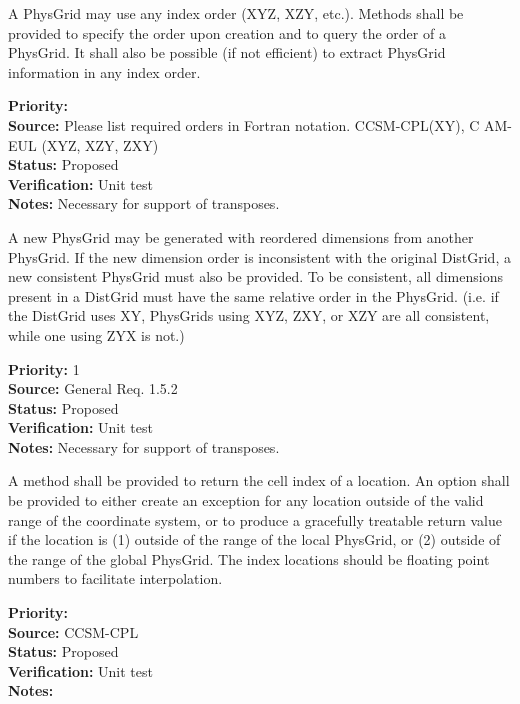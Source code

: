 A PhysGrid may use any index order (XYZ, XZY, etc.).  Methods shall be provided to
specify the order upon creation and to query the order of a PhysGrid.  It shall
also be possible (if not efficient) to extract PhysGrid information in any index
order.
\begin{reqlist}
{\bf Priority:}  \\
{\bf Source:} Please list required orders in Fortran notation. CCSM-CPL(XY), C
AM-EUL (XYZ, XZY, ZXY) \\
{\bf Status:} Proposed \\
{\bf Verification:} Unit test\\
{\bf Notes:} Necessary for support of transposes.
\end{reqlist}

A new PhysGrid may be generated with reordered dimensions from another PhysGrid.
If the new dimension order is inconsistent with the original DistGrid, a new
consistent PhysGrid must also be provided.  To be consistent, all dimensions present
in a DistGrid must have the same relative order in the PhysGrid.  (i.e. if the
DistGrid uses XY, PhysGrids using XYZ, ZXY, or XZY are all consistent, while one using
ZYX is not.)
\begin{reqlist}
{\bf Priority:} 1 \\
{\bf Source:} General Req. 1.5.2 \\
{\bf Status:} Proposed \\
{\bf Verification:} Unit test\\
{\bf Notes:} Necessary for support of transposes.
\end{reqlist}

A method shall be provided to return the cell index of a location.  An option shall
be provided to either create an exception for any location outside of the valid
range of the coordinate system, or to produce a gracefully treatable return value if
the location is (1) outside of the range of the local PhysGrid, or (2) outside of the
range of the global PhysGrid.  The index locations should be floating point numbers to
facilitate interpolation.
\begin{reqlist}
{\bf Priority:} \\
{\bf Source:} CCSM-CPL \\
{\bf Status:} Proposed \\
{\bf Verification:} Unit test \\
{\bf Notes:} 
\end{reqlist}

